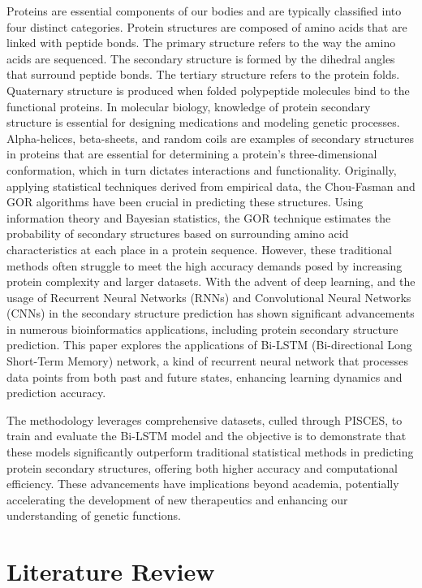 \documentclass[conference]{IEEEtran}
\begin{document}
Proteins are essential components of our bodies and are typically classified into four distinct categories. Protein structures are composed of amino acids that are linked with peptide bonds. The primary structure refers to the way the amino acids are sequenced. The secondary structure is formed by the dihedral angles that surround peptide bonds. The tertiary structure refers to the protein folds. Quaternary structure is produced when folded polypeptide molecules bind to the functional proteins. 
In molecular biology, knowledge of protein secondary structure is essential for designing medications and modeling genetic processes. Alpha-helices, beta-sheets, and random coils are examples of secondary structures in proteins that are essential for determining a protein's three-dimensional conformation, which in turn dictates interactions and functionality. Originally, applying statistical techniques derived from empirical data, the Chou-Fasman \cite{choufasman} and GOR \cite{gor} algorithms have been crucial in predicting these structures. Using information theory and Bayesian statistics, the GOR technique \cite{gor} estimates the probability of secondary structures based on surrounding amino acid characteristics at each place in a protein sequence.
However, these traditional methods often struggle to meet the high accuracy demands posed by increasing protein complexity and larger datasets. With the advent of deep learning, and the usage of Recurrent Neural Networks (RNNs)\cite{redmlp} and Convolutional Neural Networks (CNNs)\cite{cnn} in the secondary structure prediction has shown significant advancements in numerous bioinformatics applications, including protein secondary structure prediction. This paper explores the applications of Bi-LSTM (Bi-directional Long Short-Term Memory) network, a kind of recurrent neural network that processes data points from both past and future states, enhancing learning dynamics and prediction accuracy.   

The methodology leverages comprehensive datasets, culled through PISCES\cite{piscesog}, to train and evaluate the Bi-LSTM model and the objective is to demonstrate that these models significantly outperform traditional statistical methods in predicting protein secondary structures, offering both higher accuracy and computational efficiency. These advancements have implications beyond academia, potentially accelerating the development of new therapeutics and enhancing our understanding of genetic functions. 

\section{Literature Review}
\end{document}

